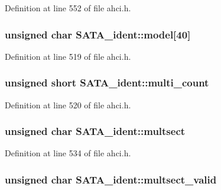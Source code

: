 Definition at line 552 of file ahci.\+h.

\subsubsection[{\texorpdfstring{model}{model}}]{\setlength{\rightskip}{0pt plus 5cm}unsigned char S\+A\+T\+A\+\_\+ident\+::model\mbox{[}40\mbox{]}}\hypertarget{structSATA__ident_a2a36d687174ca2eebc0587eb0882e89f}{}\label{structSATA__ident_a2a36d687174ca2eebc0587eb0882e89f}


Definition at line 519 of file ahci.\+h.

\subsubsection[{\texorpdfstring{multi\+\_\+count}{multi_count}}]{\setlength{\rightskip}{0pt plus 5cm}unsigned short S\+A\+T\+A\+\_\+ident\+::multi\+\_\+count}\hypertarget{structSATA__ident_ae4fad74cecade33dc2e3e24756eba3d6}{}\label{structSATA__ident_ae4fad74cecade33dc2e3e24756eba3d6}


Definition at line 520 of file ahci.\+h.

\subsubsection[{\texorpdfstring{multsect}{multsect}}]{\setlength{\rightskip}{0pt plus 5cm}unsigned char S\+A\+T\+A\+\_\+ident\+::multsect}\hypertarget{structSATA__ident_ab259130c7d5a5032eabf063e63a823e8}{}\label{structSATA__ident_ab259130c7d5a5032eabf063e63a823e8}


Definition at line 534 of file ahci.\+h.

\subsubsection[{\texorpdfstring{multsect\+\_\+valid}{multsect_valid}}]{\setlength{\rightskip}{0pt plus 5cm}unsigned char S\+A\+T\+A\+\_\+ident\+::multsect\+\_\+valid}\hypertarget{structSATA__ident_a4b96a867298b90fe2bc53cb295b8eaf6}{}\label{structSATA__ident_a4b96a867298b90fe2bc53cb295b8eaf6}


